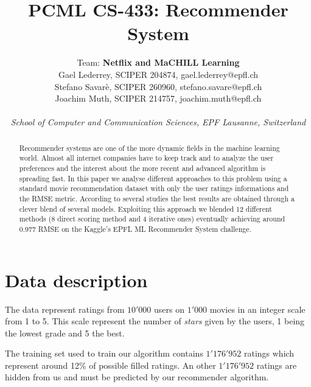 \documentclass[10pt,conference,compsocconf]{IEEEtran}
\begin{document}
\title{PCML CS-433: Recommender System}

\author{
  Team: {\bf Netflix and MaCHILL Learning} \\
  Gael Lederrey, SCIPER 204874, gael.lederrey@epfl.ch \\
  Stefano Savar\`e, SCIPER 260960, stefano.savare@epfl.ch \\
  Joachim Muth, SCIPER 214757, joachim.muth@epfl.ch\\ \\
  \textit{School of Computer and Communication Sciences, EPF Lausanne, Switzerland}
}

\maketitle

\begin{abstract}
Recommender systems are one of the more dynamic fields in the machine learning world. Almost all
internet companies have to keep track and to analyze the user preferences and the interest about the
more recent and advanced algorithm is spreading fast.
In this paper we analyse  different approaches to this problem using a standard movie recommendation
dataset with only the user ratings informations and the RMSE metric.
According to several studies \cite{BellKore_netflix} \cite{schafer2002meta} the best results are
obtained through a clever blend of several models.
Exploiting this approach we blended 12 different methods (8 direct scoring method and 4 iterative
ones) eventually achieving around 0.977 RMSE on the Kaggle's EPFL ML Recommender System challenge. 
\end{abstract}

\section{Data description}

The data represent ratings from $10'000$ users on $1'000$ movies in an integer scale from 1 to 5. This scale represent the number of \textit{stars} given by the users, 1 being the lowest grade and 5 the best.

The training set used to train our algorithm contains $1'176'952$ ratings which represent around 12\% of possible filled ratings. 
An other $1'176'952$ ratings are hidden from us and must be predicted by our recommender algorithm.
\end{document}

